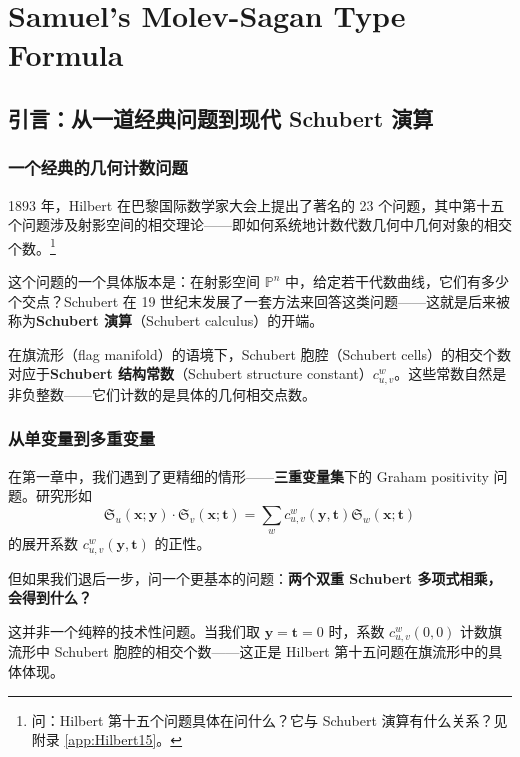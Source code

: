 
\chapter{Samuel's Molev-Sagan Type Formula}
\label{chap:MolevSagan}

\section{引言：从一道经典问题到现代 Schubert 演算}
\label{sec:ProductMotivation}

\subsection{一个经典的几何计数问题}

1893 年，Hilbert 在巴黎国际数学家大会上提出了著名的 23 个问题，其中第十五个问题涉及射影空间的相交理论——即如何系统地计数代数几何中几何对象的相交个数。\footnote{问：Hilbert 第十五个问题具体在问什么？它与 Schubert 演算有什么关系？见附录 \cref{app:Hilbert15}。}

这个问题的一个具体版本是：在射影空间 $\mathbb{P}^n$ 中，给定若干代数曲线，它们有多少个交点？Schubert 在 19 世纪末发展了一套方法来回答这类问题——这就是后来被称为\textbf{Schubert 演算}（Schubert calculus）的开端。

在旗流形（flag manifold）的语境下，Schubert 胞腔（Schubert cells）的相交个数对应于\textbf{Schubert 结构常数}（Schubert structure constant）$c_{u,v}^w$。这些常数自然是非负整数——它们计数的是具体的几何相交点数。

\subsection{从单变量到多重变量}

在第一章中，我们遇到了更精细的情形——\textbf{三重变量集}下的 Graham positivity 问题。研究形如
\begin{equation}
\mathfrak{S}_u(\mathbf{x}; \mathbf{y}) \cdot \mathfrak{S}_v(\mathbf{x}; \mathbf{t}) = \sum_w c^w_{u,v}(\mathbf{y}, \mathbf{t}) \mathfrak{S}_w(\mathbf{x}; \mathbf{t})
\label{eq:TripleProductIntro}
\end{equation}
的展开系数 $c^w_{u,v}(\mathbf{y}, \mathbf{t})$ 的正性。

但如果我们退后一步，问一个更基本的问题：\textbf{两个双重 Schubert 多项式相乘，会得到什么？}

这并非一个纯粹的技术性问题。当我们取 $\mathbf{y} = \mathbf{t} = 0$ 时，系数 $c^w_{u,v}(0, 0)$ 计数旗流形中 Schubert 胞腔的相交个数——这正是 Hilbert 第十五问题在旗流形中的具体体现。

